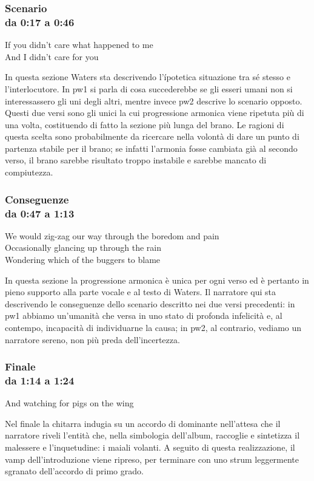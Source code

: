 \documentclass[class=book, crop=false, oneside, 12pt]{standalone}
\begin{document}
    \subsubsection*{Scenario\\ \small{da 0:17 a 0:46}}
    \begin{displayquote}
        If you didn't care what happened to me \\
        And I didn't care for you \\ 
    \end{displayquote}
    In questa sezione Waters sta descrivendo l'ípotetica situazione tra sé stesso e l'interlocutore. In \acrshort{pw1} si parla di cosa succederebbe se gli esseri umani non si interessassero gli uni degli altri, mentre invece \acrshort{pw2} descrive lo scenario opposto. Questi due versi sono gli unici la cui progressione armonica viene ripetuta più di una volta, costituendo di fatto la sezione più lunga del brano. Le ragioni di questa scelta sono probabilmente da ricercare nella volontà di dare un punto di partenza stabile per il brano; se infatti l'armonia fosse cambiata già al secondo verso, il brano sarebbe risultato troppo instabile e sarebbe mancato di compiutezza.

    \subsubsection*{Conseguenze\\ \small{da 0:47 a 1:13}}
    \begin{displayquote}
        We would zig-zag our way through the boredom and pain \\
        Occasionally glancing up through the rain \\
        Wondering which of the buggers to blame \\
    \end{displayquote}
    In questa sezione la progressione armonica è unica per ogni verso ed è pertanto in pieno supporto alla parte vocale e al testo di Waters. Il narratore qui sta descrivendo le conseguenze dello scenario descritto nei due versi precedenti: in \acrshort{pw1} abbiamo un'umanità che versa in uno stato di profonda infelicità e, al contempo, incapacità di individuarne la causa; in \acrshort{pw2}, al contrario, vediamo un narratore sereno, non più preda dell'incertezza.

    
    \subsubsection*{Finale\\ \small{da 1:14 a 1:24}}
    \begin{displayquote}
        And watching for pigs on the wing
    \end{displayquote}
    Nel finale la chitarra indugia su un accordo di dominante nell'attesa che il narratore riveli l'entità che, nella simbologia dell'album, raccoglie e sintetizza il malessere e l'inquetudine: i maiali volanti. A seguito di questa realizzazione, il vamp dell'introduzione viene ripreso, per terminare con uno strum leggermente sgranato dell'accordo di primo grado.
\end{document}
